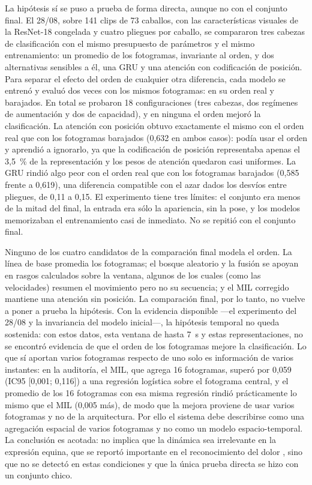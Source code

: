 La hipótesis sí se puso a prueba de forma directa, aunque no con el conjunto final. El 28/08, sobre 141 clips de 73 caballos, con las características visuales de la ResNet-18 congelada y cuatro pliegues por caballo, se compararon tres cabezas de clasificación con el mismo presupuesto de parámetros y el mismo entrenamiento: un promedio de los fotogramas, invariante al orden, y dos alternativas sensibles a él, una GRU y una atención con codificación de posición. Para separar el efecto del orden de cualquier otra diferencia, cada modelo se entrenó y evaluó dos veces con los mismos fotogramas: en su orden real y barajados. En total se probaron 18 configuraciones (tres cabezas, dos regímenes de aumentación y dos de capacidad), y en ninguna el orden mejoró la clasificación. La atención con posición obtuvo exactamente el mismo \fmacro{} con el orden real que con los fotogramas barajados (0,632 en ambos casos): podía usar el orden y aprendió a ignorarlo, ya que la codificación de posición representaba apenas el 3,5~\% de la representación y los pesos de atención quedaron casi uniformes. La GRU rindió algo peor con el orden real que con los fotogramas barajados (0,585 frente a 0,619), una diferencia compatible con el azar dados los desvíos entre pliegues, de 0,11 a 0,15. El experimento tiene tres límites: el conjunto era menos de la mitad del final, la entrada era sólo la apariencia, sin la pose, y los modelos memorizaban el entrenamiento casi de inmediato. No se repitió con el conjunto final.

Ninguno de los cuatro candidatos de la comparación final modela el orden. La línea de base promedia los fotogramas; el bosque aleatorio y la fusión se apoyan en \PoseRasgos{} rasgos calculados sobre la ventana, algunos de los cuales (como las velocidades) resumen el movimiento pero no su secuencia; y el MIL corregido mantiene una atención sin posición. La comparación final, por lo tanto, no vuelve a poner a prueba la hipótesis. Con la evidencia disponible ---el experimento del 28/08 y la invariancia del modelo inicial---, la hipótesis temporal no queda sostenida: con estos datos, esta ventana de hasta 7~s y estas representaciones, no se encontró evidencia de que el orden de los fotogramas mejore la clasificación. Lo que sí aportan varios fotogramas respecto de uno solo es información de varios instantes: en la auditoría, el MIL, que agrega 16 fotogramas, superó por 0,059 (IC95 [0,001; 0,116]) a una regresión logística sobre el fotograma central, y el promedio de los 16 fotogramas con esa misma regresión rindió prácticamente lo mismo que el MIL (0,005 más), de modo que la mejora proviene de usar varios fotogramas y no de la arquitectura. Por ello el sistema debe describirse como una agregación espacial de varios fotogramas y no como un modelo espacio-temporal. La conclusión es acotada: no implica que la dinámica sea irrelevante en la expresión equina, que se reportó importante en el reconocimiento del dolor \parencite{broome2019}, sino que no se detectó en estas condiciones y que la única prueba directa se hizo con un conjunto chico.

